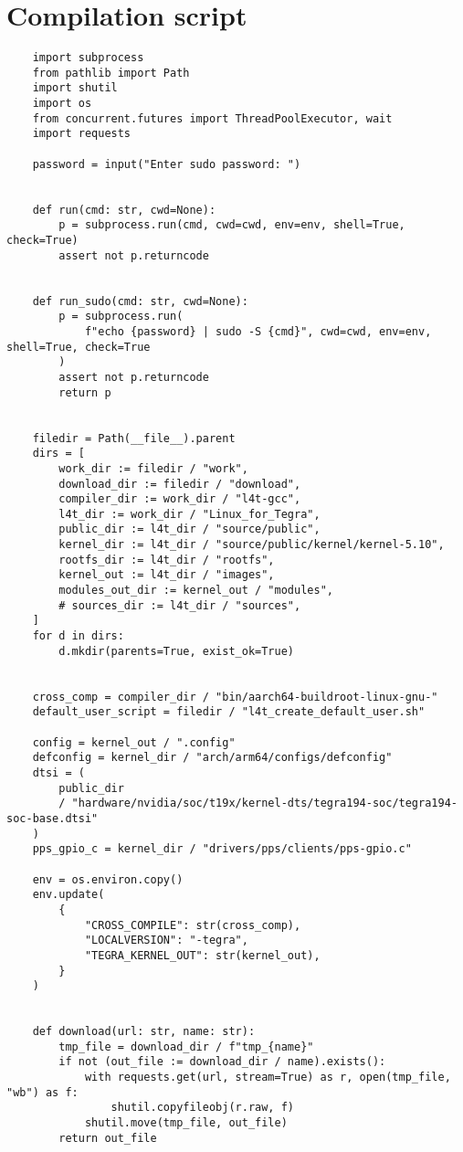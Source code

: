 \section{Compilation script}
\begin{verbatim}
    import subprocess
    from pathlib import Path
    import shutil
    import os
    from concurrent.futures import ThreadPoolExecutor, wait
    import requests
    
    password = input("Enter sudo password: ")
    
    
    def run(cmd: str, cwd=None):
        p = subprocess.run(cmd, cwd=cwd, env=env, shell=True, check=True)
        assert not p.returncode
    
    
    def run_sudo(cmd: str, cwd=None):
        p = subprocess.run(
            f"echo {password} | sudo -S {cmd}", cwd=cwd, env=env, shell=True, check=True
        )
        assert not p.returncode
        return p
    
    
    filedir = Path(__file__).parent
    dirs = [
        work_dir := filedir / "work",
        download_dir := filedir / "download",
        compiler_dir := work_dir / "l4t-gcc",
        l4t_dir := work_dir / "Linux_for_Tegra",
        public_dir := l4t_dir / "source/public",
        kernel_dir := l4t_dir / "source/public/kernel/kernel-5.10",
        rootfs_dir := l4t_dir / "rootfs",
        kernel_out := l4t_dir / "images",
        modules_out_dir := kernel_out / "modules",
        # sources_dir := l4t_dir / "sources",
    ]
    for d in dirs:
        d.mkdir(parents=True, exist_ok=True)
    
    
    cross_comp = compiler_dir / "bin/aarch64-buildroot-linux-gnu-"
    default_user_script = filedir / "l4t_create_default_user.sh"
    
    config = kernel_out / ".config"
    defconfig = kernel_dir / "arch/arm64/configs/defconfig"
    dtsi = (
        public_dir
        / "hardware/nvidia/soc/t19x/kernel-dts/tegra194-soc/tegra194-soc-base.dtsi"
    )
    pps_gpio_c = kernel_dir / "drivers/pps/clients/pps-gpio.c"
    
    env = os.environ.copy()
    env.update(
        {
            "CROSS_COMPILE": str(cross_comp),
            "LOCALVERSION": "-tegra",
            "TEGRA_KERNEL_OUT": str(kernel_out),
        }
    )
    
    
    def download(url: str, name: str):
        tmp_file = download_dir / f"tmp_{name}"
        if not (out_file := download_dir / name).exists():
            with requests.get(url, stream=True) as r, open(tmp_file, "wb") as f:
                shutil.copyfileobj(r.raw, f)
            shutil.move(tmp_file, out_file)
        return out_file
    

\end{verbatim}
